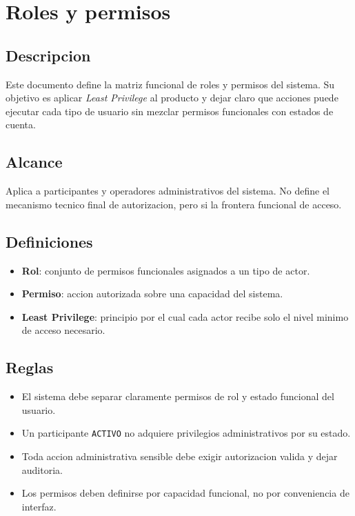 \section{Roles y permisos}

\subsection{Descripcion}

Este documento define la matriz funcional de roles y permisos del sistema. Su objetivo es aplicar \textit{Least Privilege} al producto y dejar claro que acciones puede ejecutar cada tipo de usuario sin mezclar permisos funcionales con estados de cuenta.

\subsection{Alcance}

Aplica a participantes y operadores administrativos del sistema. No define el mecanismo tecnico final de autorizacion, pero si la frontera funcional de acceso.

\subsection{Definiciones}

\begin{itemize}
  \item \textbf{Rol}: conjunto de permisos funcionales asignados a un tipo de actor.
  \item \textbf{Permiso}: accion autorizada sobre una capacidad del sistema.
  \item \textbf{Least Privilege}: principio por el cual cada actor recibe solo el nivel minimo de acceso necesario.
\end{itemize}

\subsection{Reglas}

\begin{itemize}
  \item El sistema debe separar claramente permisos de rol y estado funcional del usuario.
  \item Un participante \texttt{ACTIVO} no adquiere privilegios administrativos por su estado.
  \item Toda accion administrativa sensible debe exigir autorizacion valida y dejar auditoria.
  \item Los permisos deben definirse por capacidad funcional, no por conveniencia de interfaz.
\end{itemize}

